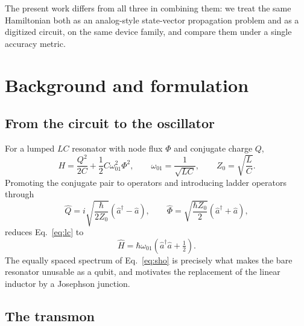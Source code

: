 \documentclass[smallextended]{svjour3}
\begin{document}
The present work differs from all three in combining them: we treat the same
Hamiltonian both as an analog-style state-vector propagation problem and as a digitized
circuit, on the same device family, and compare them under a single accuracy metric.

\section{Background and formulation}
\label{sec:background}

\subsection{From the circuit to the oscillator}

For a lumped $LC$ resonator with node flux $\Phi$ and conjugate charge $Q$,
\begin{equation}
H = \frac{Q^2}{2C} + \frac{1}{2} C \omega_{01}^2 \Phi^2,
\qquad
\omega_{01} = \frac{1}{\sqrt{LC}},
\qquad
Z_0 = \sqrt{\frac{L}{C}} .
\label{eq:lc}
\end{equation}
Promoting the conjugate pair to operators and introducing ladder operators through
\begin{equation}
\hat{Q} = i\sqrt{\frac{\hbar}{2 Z_0}}\left(\hat{a}^\dagger - \hat{a}\right),
\qquad
\hat{\Phi} = \sqrt{\frac{\hbar Z_0}{2}}\left(\hat{a}^\dagger + \hat{a}\right),
\label{eq:ladder}
\end{equation}
reduces Eq.~\eqref{eq:lc} to
\begin{equation}
\hat{H} = \hbar \omega_{01}\left(\hat{a}^\dagger \hat{a} + \tfrac{1}{2}\right).
\label{eq:sho}
\end{equation}
The equally spaced spectrum of Eq.~\eqref{eq:sho} is precisely what makes the bare
resonator unusable as a qubit, and motivates the replacement of the linear inductor by
a Josephson junction.

\subsection{The transmon}
\end{document}

